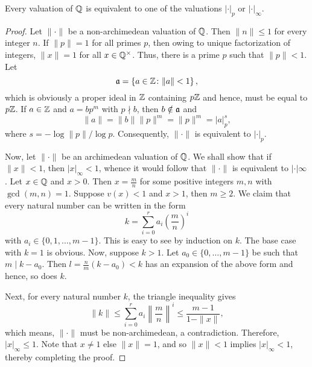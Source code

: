\begin{theorem}[Ostrowski]
    Every valuation of $\mathbb{Q}$ is equivalent to one of the valuations $|\cdot|_p$ or $|\cdot|_\infty$.
\end{theorem}
\begin{proof}
    Let $\|\cdot\|$ be a non-archimedean valuation of $\mathbb{Q}$. Then $\|n\|\le 1$ for every integer $n$. If $\|p\| = 1$ for all primes $p$, then owing to unique factorization of integers, $\|x\| = 1$ for all $x\in\mathbb{Q}^\times$. Thus, there is a prime $p$ such that $\|p\| < 1$. Let 
    \begin{equation*}
        \mathfrak{a} = \left\{a\in\mathbb{Z}\colon \|a\| < 1\right\},
    \end{equation*}
    which is obviously a proper ideal in $\mathbb{Z}$ containing $p\mathbb{Z}$ and hence, must be equal to $p\mathbb{Z}$. If $a\in\mathbb{Z}$ and $a = bp^m$ with $p\nmid b$, then $b\notin\mathfrak{a}$ and 
    \begin{equation*}
        \|a\| = \|b\|\|p\|^m = \|p\|^m = |a|_p^s,
    \end{equation*}
    where $s = - \log\|p\|/\log p$. Consequently, $\|\cdot\|$ is equivalent to $|\cdot|_p$.

    Now, let $\|\cdot\|$ be an archimedean valuation of $\mathbb{Q}$. We shall show that if $\|x\| < 1$, then $|x|_\infty < 1$, whence it would follow that $\|\cdot\|$ is equivalent to $|\cdot|\infty$. Let $x\in\mathbb{Q}$ and $x > 0$. Then $x = \frac mn$ for some positive integers $m, n$ with $\gcd(m, n) = 1$. Suppose $v(x) < 1$ and $x > 1$, then $m\ge 2$. We claim that every natural number can be written in the form 
    \begin{equation*}
        k = \sum_{i = 0}^{r} a_i\left(\frac{m}{n}\right)^i 
    \end{equation*}
    with $a_i\in\{0,1,\dots, m - 1\}$. This is easy to see by induction on $k$. The base case with $k = 1$ is obvious. Now, suppose $k > 1$. Let $a_0\in\{0,\dots, m - 1\}$ be such that $m\mid k - a_0$. Then $l = \frac{n}{m}(k - a_0) < k$ has an expansion of the above form and hence, so does $k$.

    Next, for every natural number $k$, the triangle inequality gives
    \begin{equation*}
        \|k\|\le\sum_{i = 0}^r a_i\left\|\frac{m}{n}\right\|^i\le\frac{m - 1}{1 - \|x\|},
    \end{equation*}
    which means, $\|\cdot\|$ must be non-archimedean, a contradiction. Therefore, $|x|_\infty\le 1$. Note that $x\ne 1$ else $\|x\| = 1$, and so $\|x\| < 1$ implies $|x|_\infty < 1$, thereby completing the proof.
\end{proof}

